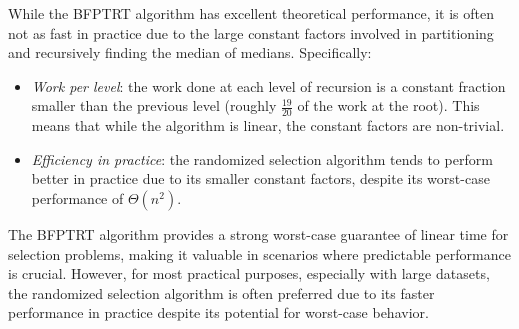 While the BFPTRT algorithm has excellent theoretical performance, it is often not as fast in practice due to the large constant factors involved in partitioning and recursively finding the median of medians. Specifically:
\begin{itemize}
    \item \textit{Work per level}: the work done at each level of recursion is a constant fraction smaller than the previous level (roughly $\frac{19}{20}$ of the work at the root). 
        This means that while the algorithm is linear, the constant factors are non-trivial.
    \item \textit{Efficiency in practice}: the randomized selection algorithm tends to perform better in practice due to its smaller constant factors, despite its worst-case performance of $\Theta(n^2)$. 
\end{itemize}
The BFPTRT algorithm provides a strong worst-case guarantee of linear time for selection problems, making it valuable in scenarios where predictable performance is crucial. 
However, for most practical purposes, especially with large datasets, the randomized selection algorithm is often preferred due to its faster performance in practice despite its potential for worst-case behavior.
